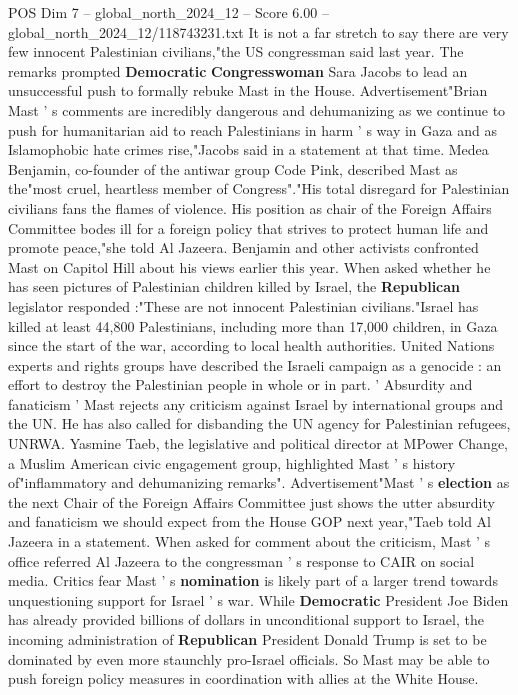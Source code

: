 \begin{textsample}{POS Dim 7 – global\_north\_2024\_12 – Score 6.00 – global\_north\_2024\_12/118743231.txt}
It is not a far stretch to say there are very few innocent Palestinian civilians,"the US congressman said last year.
The remarks prompted \textbf{Democratic} \textbf{Congresswoman} Sara Jacobs to lead an unsuccessful push to formally rebuke Mast in the House.
Advertisement"Brian Mast ' s comments are incredibly dangerous and dehumanizing as we continue to push for humanitarian aid to reach Palestinians in harm ' s way in Gaza and as Islamophobic hate crimes rise,"Jacobs said in a statement at that time.
Medea Benjamin, co-founder of the antiwar group Code Pink, described Mast as the"most cruel, heartless member of Congress"."His total disregard for Palestinian civilians fans the flames of violence.
His position as chair of the Foreign Affairs Committee bodes ill for a foreign policy that strives to protect human life and promote peace,"she told Al Jazeera.
Benjamin and other activists confronted Mast on Capitol Hill about his views earlier this year.
When asked whether he has seen pictures of Palestinian children killed by Israel, the \textbf{Republican} legislator responded :"These are not innocent Palestinian civilians."Israel has killed at least 44,800 Palestinians, including more than 17,000 children, in Gaza since the start of the war, according to local health authorities.
United Nations experts and rights groups have described the Israeli campaign as a genocide : an effort to destroy the Palestinian people in whole or in part. ' Absurdity and fanaticism ' Mast rejects any criticism against Israel by international groups and the UN.
He has also called for disbanding the UN agency for Palestinian refugees, UNRWA.
Yasmine Taeb, the legislative and political director at MPower Change, a Muslim American civic engagement group, highlighted Mast ' s history of"inflammatory and dehumanizing remarks".
Advertisement"Mast ' s \textbf{election} as the next Chair of the Foreign Affairs Committee just shows the utter absurdity and fanaticism we should expect from the House GOP next year,"Taeb told Al Jazeera in a statement.
When asked for comment about the criticism, Mast ' s office referred Al Jazeera to the congressman ' s response to CAIR on social media.
Critics fear Mast ' s \textbf{nomination} is likely part of a larger trend towards unquestioning support for Israel ' s war.
While \textbf{Democratic} President Joe Biden has already provided billions of dollars in unconditional support to Israel, the incoming administration of \textbf{Republican} President Donald Trump is set to be dominated by even more staunchly pro-Israel officials.
So Mast may be able to push foreign policy measures in coordination with allies at the White House.

\end{textsample}
